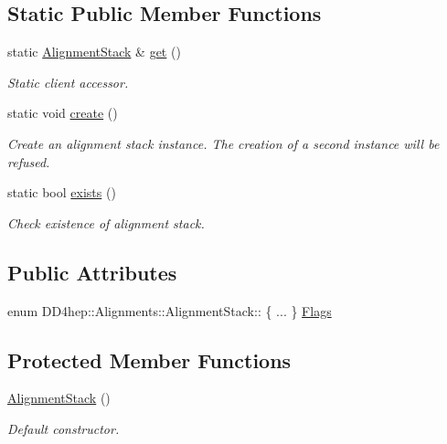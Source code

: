 \subsection*{Static Public Member Functions}
\begin{DoxyCompactItemize}
\item 
static \hyperlink{class_d_d4hep_1_1_alignments_1_1_alignment_stack}{AlignmentStack} \& \hyperlink{class_d_d4hep_1_1_alignments_1_1_alignment_stack_aa39f02a46ed00baec0b3a09e42e3af1c}{get} ()
\begin{DoxyCompactList}\small\item\em Static client accessor. \item\end{DoxyCompactList}\item 
static void \hyperlink{class_d_d4hep_1_1_alignments_1_1_alignment_stack_a1244b4fa8cde1f3991957f689810ae4c}{create} ()
\begin{DoxyCompactList}\small\item\em Create an alignment stack instance. The creation of a second instance will be refused. \item\end{DoxyCompactList}\item 
static bool \hyperlink{class_d_d4hep_1_1_alignments_1_1_alignment_stack_aa2cbfdbfcd9a294c3f5487e5bf248b6a}{exists} ()
\begin{DoxyCompactList}\small\item\em Check existence of alignment stack. \item\end{DoxyCompactList}\end{DoxyCompactItemize}
\subsection*{Public Attributes}
\begin{DoxyCompactItemize}
\item 
enum DD4hep::Alignments::AlignmentStack:: \{ ... \}  \hyperlink{class_d_d4hep_1_1_alignments_1_1_alignment_stack_acf79d8d4af7ef5666d1096280c8da3e8}{Flags}
\end{DoxyCompactItemize}
\subsection*{Protected Member Functions}
\begin{DoxyCompactItemize}
\item 
\hyperlink{class_d_d4hep_1_1_alignments_1_1_alignment_stack_acc1d9b3831a66d74c6ef2adde3bc97c6}{AlignmentStack} ()
\begin{DoxyCompactList}\small\item\em Default constructor. \item\end{DoxyCompactList}\end{DoxyCompactItemize}
